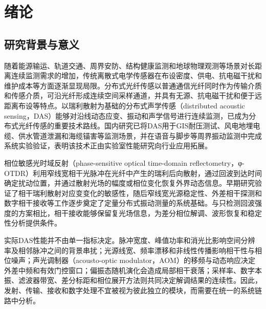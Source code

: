 \chapter{绪论}

\section{研究背景与意义}

随着能源输运、轨道交通、周界安防、结构健康监测和地球物理观测等场景对长距离连续监测需求的增加，传统离散式电学传感器在布设密度、供电、抗电磁干扰和维护成本等方面逐渐显现局限。分布式光纤传感以普通通信光纤同时作为传输介质和传感介质，可沿光纤形成连续空间采样通道，并具有无源、抗电磁干扰和便于远距离布设等特点。以瑞利散射为基础的分布式声学传感（distributed acoustic sensing，DAS）能够对沿线动态应变、振动和声学信号进行连续监测，已成为分布式光纤传感的重要技术路线\cite{zhang2021phase_cn,muanenda2018advances,wang2020recent,he2021review,liu2022advances,shang2022research,zhu2022linear}。国内研究已将DAS用于GIS耐压测试、风电地埋电缆、供水管道泄漏和海缆锚害等监测场景\cite{huang2023gis_cn,huang2025cable_thesis,zhang2023pipeline_thesis,zhang2025submarine_cn}，并在语音与脚步等周界振动监测中完成系统实验验证\cite{sun2023voice_cn}，表明该技术正由实验室性能研究向行业应用拓展。

相位敏感光时域反射（phase-sensitive optical time-domain reflectometry，φ-OTDR）利用窄线宽相干光脉冲在光纤中产生的瑞利后向散射，通过回波到达时间确定扰动位置，并通过散射光场的幅度或相位变化恢复外界动态信息。早期研究验证了相干瑞利散射对应变变化的敏感性\cite{posey2000strain}，随后窄线宽光源稳定性\cite{choi2003stable}、外差相干探测\cite{lu2010distributed}和数字相干接收\cite{pan2011phase}等工作逐步奠定了定量分布式振动测量的系统基础。与只检测回波强度的方案相比，相干接收能够保留复光场信息，为差分相位解调、波形恢复和稳定性分析提供条件\cite{liokumovich2015fundamentals,yang2022digitalized}。

实际DAS性能并不由单一指标决定。脉冲宽度、峰值功率和消光比影响空间分辨率及相邻脉冲之间的背景串扰；光源线宽、频率漂移和非线性传播影响相干性与相位噪声；声光调制器（acousto-optic modulator，AOM）的移频与动态响应决定外差中频和有效门控窗口；偏振态随机演化会造成局部相干衰落；采样率、数字本振、滤波器带宽、差分标距和相位展开方法则共同决定解调结果的连续性\cite{martins2013modulation,ren2016extinction,lu2021detection,lu2022phaseerror,zhong2021frequency,zhao2024frequency,qian2025drift}。因此，发射、传输、接收和数字处理不宜被视为彼此独立的模块，而需要在统一的系统链路中分析。

